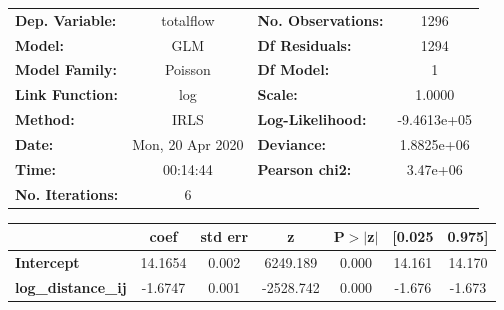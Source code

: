 \begin{center}
\begin{tabular}{lclc}
\toprule
\textbf{Dep. Variable:}    &    totalflow     & \textbf{  No. Observations:  } &      1296    \\
\textbf{Model:}            &       GLM        & \textbf{  Df Residuals:      } &      1294    \\
\textbf{Model Family:}     &     Poisson      & \textbf{  Df Model:          } &         1    \\
\textbf{Link Function:}    &       log        & \textbf{  Scale:             } &     1.0000   \\
\textbf{Method:}           &       IRLS       & \textbf{  Log-Likelihood:    } & -9.4613e+05  \\
\textbf{Date:}             & Mon, 20 Apr 2020 & \textbf{  Deviance:          } &  1.8825e+06  \\
\textbf{Time:}             &     00:14:44     & \textbf{  Pearson chi2:      } &   3.47e+06   \\
\textbf{No. Iterations:}   &        6         & \textbf{                     } &              \\
\bottomrule
\end{tabular}
\begin{tabular}{lcccccc}
                           & \textbf{coef} & \textbf{std err} & \textbf{z} & \textbf{P$> |$z$|$} & \textbf{[0.025} & \textbf{0.975]}  \\
\midrule
\textbf{Intercept}         &      14.1654  &        0.002     &  6249.189  &         0.000        &       14.161    &       14.170     \\
\textbf{log\_distance\_ij} &      -1.6747  &        0.001     & -2528.742  &         0.000        &       -1.676    &       -1.673     \\
\bottomrule
\end{tabular}
\end{center}